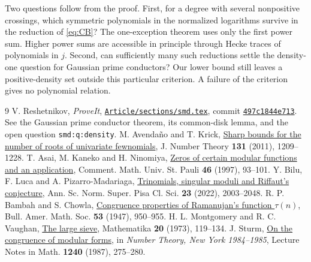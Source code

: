 \documentclass[11pt]{article}
\newcommand{\repos}{https://github.com/VladimirReshetnikov/ProveIt/blob/497c1844e71393df41914f5b783d5dc9a618eb61/Analysis/GeneralizedRiemannHypothesis/Article/sections/smd.tex}
\begin{document}
Two questions follow from the proof. First, for a degree with several nonpositive crossings, which symmetric polynomials in the normalized logarithms survive in the reduction of \eqref{eq:CB}? The one-exception theorem uses only the first power sum. Higher power sums are accessible in principle through Hecke traces of polynomials in $j$. Second, can sufficiently many such reductions settle the density-one question for Gaussian prime conductors? Our lower bound still leaves a positive-density set outside this particular criterion. A failure of the criterion gives no polynomial relation.
\begin{thebibliography}{9}\small
{} V. Reshetnikov, \emph{ProveIt}, \href{\repos}{\texttt{Article/sections/smd.tex}}, commit \href{https://github.com/VladimirReshetnikov/ProveIt/commit/497c1844e71393df41914f5b783d5dc9a618eb61}{\texttt{497c1844e713}}.
See the Gaussian prime conductor theorem, its common-disk lemma, and the open question \texttt{smd:q:density}.
 M. Avenda\~no and T. Krick, \href{https://arxiv.org/abs/1008.4808}{Sharp bounds for the number of roots of univariate fewnomials}, J. Number Theory \textbf{131} (2011), 1209--1228.
 T. Asai, M. Kaneko and H. Ninomiya, \href{https://www2.math.kyushu-u.ac.jp/~mkaneko/papers/AKN.pdf}{Zeros of certain modular functions and an application}, Comment. Math. Univ. St. Pauli \textbf{46} (1997), 93--101.
 Y. Bilu, F. Luca and A. Pizarro-Madariaga, \href{https://doi.org/10.2422/2036-2145.202010_025}{Trinomials, singular moduli and Riffaut's conjecture}, Ann. Sc. Norm. Super. Pisa Cl. Sci. \textbf{23} (2022), 2003--2048.
 R. P. Bambah and S. Chowla, \href{https://doi.org/10.1090/S0002-9904-1947-08913-8}{Congruence properties of Ramanujan's function $\tau(n)$}, Bull. Amer. Math. Soc. \textbf{53} (1947), 950--955.
 H. L. Montgomery and R. C. Vaughan, \href{https://doi.org/10.1112/S0025579300004708}{The large sieve}, Mathematika \textbf{20} (1973), 119--134.
 J. Sturm, \href{https://doi.org/10.1007/BFb0072985}{On the congruence of modular forms}, in \emph{Number Theory, New York 1984--1985}, Lecture Notes in Math. \textbf{1240} (1987), 275--280.
\end{thebibliography}
\end{document}
